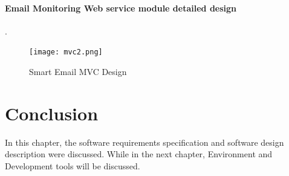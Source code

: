 \paragraph{Email Monitoring Web service module detailed design}
.\\
\begin{figure}[H]
  \centering
  \texttt{[image: mvc2.png]}
  \caption[Smart Email MVC Design]{Smart Email MVC Design}
\end{figure}


\section{Conclusion}
\label{sec:conclusion_4}
In this chapter, the software requirements specification and software design
description were discussed. While in the next chapter, Environment and 
Development tools will be discussed.
